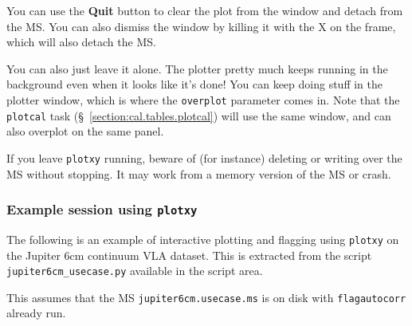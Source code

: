 You can use the {\bf Quit} button to clear the plot from the
window and detach from the MS.  You can also dismiss the 
window by killing it with the X on the frame, which will also
detach the MS.

You can also just leave it alone.  The plotter pretty much keeps running
in the background even when it looks like it's done!  You can
keep doing stuff in the plotter window, which is where the
{\tt overplot} parameter comes in.  Note that the {\tt plotcal}
task (\S~\ref{section:cal.tables.plotcal}) will use the same window, and
can also overplot on the same panel.

If you leave {\tt plotxy} running, beware of (for instance)
deleting or writing over the MS without stopping.  It may work
from a memory version of the MS or crash.

\subsubsection{Example session using {\tt plotxy}}
\label{section:edit.plot.plotxy.example}

The following is an example of interactive plotting and flagging
using {\tt plotxy} on the Jupiter 6cm continuum VLA dataset.
This is extracted from the script {\tt jupiter6cm\_usecase.py}
available in the script area.

This assumes that the MS {\tt jupiter6cm.usecase.ms} is
on disk with {\tt flagautocorr} already run.

